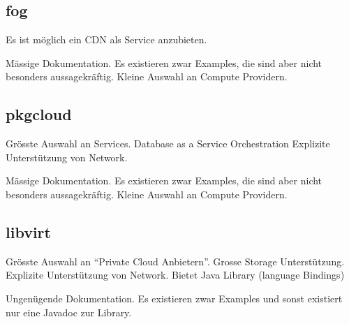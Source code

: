 \documentclass[11pt]{scrartcl}
\begin{document}
\subsection{fog}
\begin{Argumentation}
\pro Es ist möglich ein CDN als Service anzubieten.

\contra Mässige Dokumentation. Es existieren zwar 
Examples, die sind aber nicht besonders aussagekräftig.
\contra Kleine Auswahl an Compute Providern.
\end{Argumentation}

\subsection{pkgcloud}
\begin{Argumentation}
\pro Grösste Auswahl an Services.
\pro Database as a Service
\pro Orchestration
\pro Explizite Unterstützung von Network.

\contra Mässige Dokumentation. Es existieren zwar Examples, die sind aber nicht besonders aussagekräftig.
\contra Kleine Auswahl an Compute Providern.
\end{Argumentation}

\subsection{libvirt}
\begin{Argumentation}
\pro Grösste Auswahl an ``Private Cloud Anbietern''.
\pro Grosse Storage Unterstützung.
\pro Explizite Unterstützung von Network.
\pro Bietet Java Library (language Bindings)

\contra Ungenügende Dokumentation. Es existieren zwar Examples und 
sonst existiert nur eine Javadoc zur Library.
\end{Argumentation}
\end{document}

